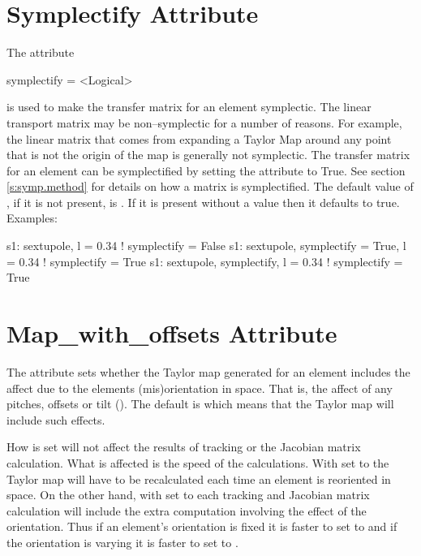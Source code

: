 \section{Symplectify Attribute}
\label{s:symp}

The  attribute
\begin{example}
  symplectify = <Logical>
\end{example}
is used to make the transfer matrix for an element symplectic. The
linear transport matrix may be non--symplectic for a number of
reasons.  For example, the linear matrix that comes from expanding a
Taylor Map around any point that is not the origin of the map is
generally not symplectic. The transfer matrix for an element can be
symplectified by setting the  attribute to True. See
section \ref{s:symp.method} for details on how a matrix is
symplectified. The default value of , if it is not
present, is . If it is present without a value then it
defaults to true. Examples:
\begin{example}
  s1: sextupole, l = 0.34                       ! symplectify = False
  s1: sextupole, symplectify = True, l = 0.34   ! symplectify = True
  s1: sextupole, symplectify, l = 0.34          ! symplectify = True
\end{example}

\section{Map_with_offsets Attribute}
\label{s:mapoff}

The  attribute sets whether the Taylor map
generated for an element includes the affect due to the elements
(mis)orientation in space. That is, the affect of any pitches, offsets
or tilt (). The default is  which means that
the Taylor map will include such effects. 

How  is set will not affect the results of
tracking or the Jacobian matrix calculation. What is affected is the
speed of the calculations. With  set to 
the Taylor map will have to be recalculated each time an element is
reoriented in space. On the other hand, with  set
to  each tracking and Jacobian matrix calculation will
include the extra computation involving the effect of the
orientation. Thus if an element's orientation is fixed it is faster to
set  to  and if the orientation is
varying it is faster to set  to .
